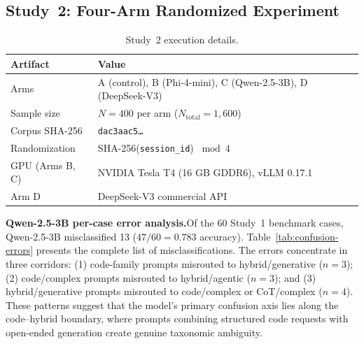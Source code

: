 \documentclass{article}
\begin{document}
\subsection{Study~2: Four-Arm Randomized Experiment}

\begin{table}[htbp]
\centering
\caption{Study~2 execution details.}
\label{tab:study2-runids}
\begin{tabular}{ll}
\toprule
Artifact & Value \\
\midrule
Arms & A (control), B (Phi-4-mini), C (Qwen-2.5-3B), D (DeepSeek-V3) \\
Sample size & $N = 400$ per arm ($N_{\text{total}} = 1{,}600$) \\
Corpus SHA-256 & \texttt{dac3aac5\ldots} \\
Randomization & SHA-256(\texttt{session\_id}) $\bmod 4$ \\
GPU (Arms B, C) & NVIDIA Tesla T4 (16 GB GDDR6), vLLM 0.17.1 \\
Arm D & DeepSeek-V3 commercial API \\
\bottomrule
\end{tabular}
\end{table}

\textbf{Qwen-2.5-3B per-case error analysis.}\quad Of the 60 Study~1 benchmark cases, Qwen-2.5-3B misclassified 13 ($47/60 = 0.783$ accuracy). Table~\ref{tab:confusion-errors} presents the complete list of misclassifications. The errors concentrate in three corridors: (1) code-family prompts misrouted to hybrid/generative ($n = 3$); (2) code/complex prompts misrouted to hybrid/agentic ($n = 3$); and (3) hybrid/generative prompts misrouted to code/complex or CoT/complex ($n = 4$). These patterns suggest that the model's primary confusion axis lies along the code--hybrid boundary, where prompts combining structured code requests with open-ended generation create genuine taxonomic ambiguity.
\end{document}
